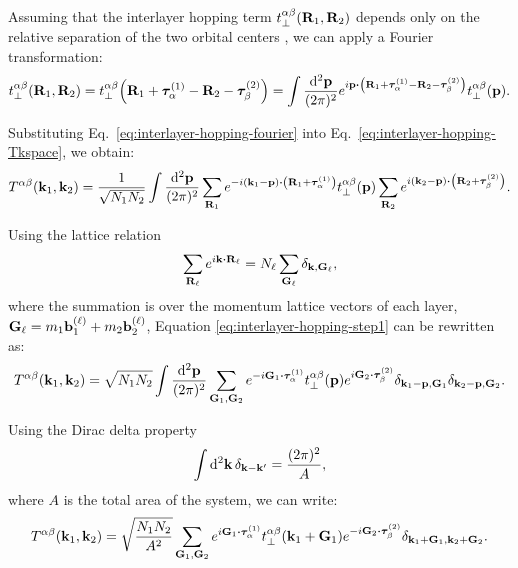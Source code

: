 Assuming that the interlayer hopping term \( t_\perp^{\alpha\beta}({\vb{R}}_1,{\vb{R}}_2) \) depends only on the relative separation of the two orbital centers \cite{macdonald2011}, we can apply a Fourier transformation:
\begin{equation} \label{eq:interlayer-hopping-fourier}
t_\perp^{\alpha\beta}(\R_1,\R_2) = t_\perp^{\alpha\beta}\qty(\R_1+\vtau_{\alpha}^{(1)}-\R_2-\vtau_{\beta}^{(2)}) =
\int \frac{\dd[2]{\p}}{(2\pi)^2} e^{i \p \vdot \qty(\R_1+\vtau_{\alpha}^{(1)}-\R_2-\vtau_{\beta}^{(2)})} t_\perp^{\alpha\beta}(\p).
\end{equation}

Substituting Eq.~\eqref{eq:interlayer-hopping-fourier} into Eq.~\eqref{eq:interlayer-hopping-Tkspace}, we obtain:
\begin{equation} \label{eq:interlayer-hopping-step1}
T^{\alpha\beta}(\k_1,\k_2) =
\frac{1}{\sqrt{N_1 N_2}} \int \frac{\dd[2]{\p}}{(2\pi)^2} \sum_{\R_1} e^{-i(\k_1-\p)\vdot\qty(\R_1+\vtau_{\alpha}^{(1)})}
t_\perp^{\alpha\beta}(\p) \sum_{\R_2} e^{i(\k_2-\p)\vdot\qty(\R_2+\vtau_{\beta}^{(2)})}.
\end{equation}

Using the lattice relation
\begin{equation} \label{eq:delta_lattice_relation}
\sum_{\R_\ell} e^{i \k \vdot \R_\ell} = N_\ell \sum_{\G_\ell} \delta_{\k,\G_\ell},
\end{equation}
where the summation is over the momentum lattice vectors of each layer, \({\vb{G}}_\ell = m_1 {\vb{b}}_1^{(\ell)} + m_2 {\vb{b}}_2^{(\ell)}\), Equation \eqref{eq:interlayer-hopping-step1} can be rewritten as:
\begin{equation} \label{eq:interlayer-hopping-step2}
T^{\alpha\beta}(\k_1,\k_2) =
\sqrt{N_1 N_2} \int \frac{\dd[2]{\p}}{(2\pi)^2} \sum_{\G_1, \G_2}
e^{-i \G_1 \vdot \vtau_\alpha^{(1)}} t_\perp^{\alpha\beta}(\p) e^{i \G_2\vdot\vtau_\beta^{(2)}}
\delta_{\k_1-\p, \G_1} \delta_{\k_2-\p, \G_2}.
\end{equation}

Using the Dirac delta property
\begin{equation} \label{eq:dirac_delta_2d_property}
\int \dd[2]{{\vb{k}}} \delta_{{\vb{k}}-{\vb{k}}'} = \frac{(2\pi)^2}{A},
\end{equation}
where \(A\) is the total area of the system, we can write:
\begin{equation} \label{eq:interlayer-hopping-step3}
T^{\alpha\beta}(\k_1,\k_2) =
\sqrt{\frac{N_1 N_2}{A^2}} \sum_{\G_1, \G_2}
e^{i \G_1 \vdot \vtau_\alpha^{(1)}} t_\perp^{\alpha\beta}(\k_1+\G_1) e^{-i \G_2\vdot\vtau_\beta^{(2)}}
\delta_{\k_1+\G_1, \k_2+\G_2}.
\end{equation}

